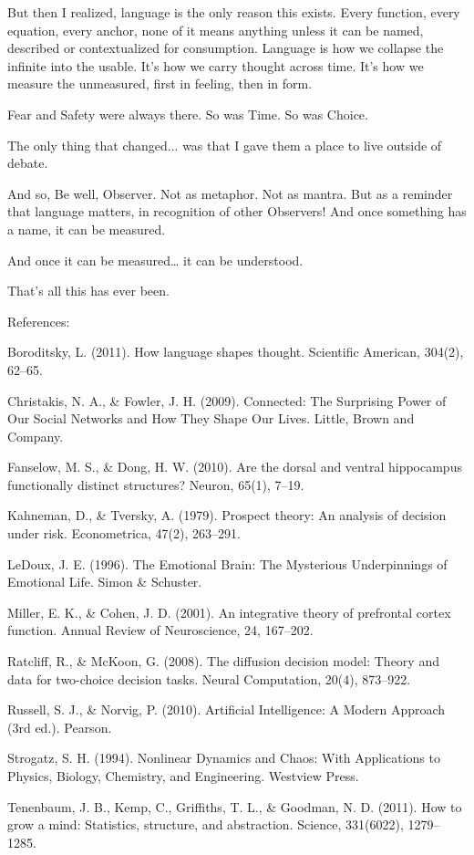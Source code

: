 \documentclass[11pt]{article}
\begin{document}
But then I realized, language is the only reason this exists. Every function, every equation, every anchor, none of it means anything unless it can be named, described or contextualized for consumption. Language is how we collapse the infinite into the usable. It’s how we carry thought across time. It’s how we measure the unmeasured, first in feeling, then in form.

Fear and Safety were always there.
So was Time. So was Choice.

The only thing that changed... was that I gave them a place to live outside of debate.

And so, Be well, Observer.
Not as metaphor. Not as mantra.
But as a reminder that language matters, in recognition of other Observers!
And once something has a name,
it can be measured.

And once it can be measured…
it can be understood.

That’s all this has ever been. 

References:

Boroditsky, L. (2011). How language shapes thought. Scientific American, 304(2), 62–65.

Christakis, N. A., & Fowler, J. H. (2009). Connected: The Surprising Power of Our Social Networks and How They Shape Our Lives. Little, Brown and Company.

Fanselow, M. S., & Dong, H. W. (2010). Are the dorsal and ventral hippocampus functionally distinct structures? Neuron, 65(1), 7–19.

Kahneman, D., & Tversky, A. (1979). Prospect theory: An analysis of decision under risk. Econometrica, 47(2), 263–291.

LeDoux, J. E. (1996). The Emotional Brain: The Mysterious Underpinnings of Emotional Life. Simon & Schuster.

Miller, E. K., & Cohen, J. D. (2001). An integrative theory of prefrontal cortex function. Annual Review of Neuroscience, 24, 167–202.

Ratcliff, R., & McKoon, G. (2008). The diffusion decision model: Theory and data for two-choice decision tasks. Neural Computation, 20(4), 873–922.

Russell, S. J., & Norvig, P. (2010). Artificial Intelligence: A Modern Approach (3rd ed.). Pearson.

Strogatz, S. H. (1994). Nonlinear Dynamics and Chaos: With Applications to Physics, Biology, Chemistry, and Engineering. Westview Press.

Tenenbaum, J. B., Kemp, C., Griffiths, T. L., & Goodman, N. D. (2011). How to grow a mind: Statistics, structure, and abstraction. Science, 331(6022), 1279–1285.
\end{document}
